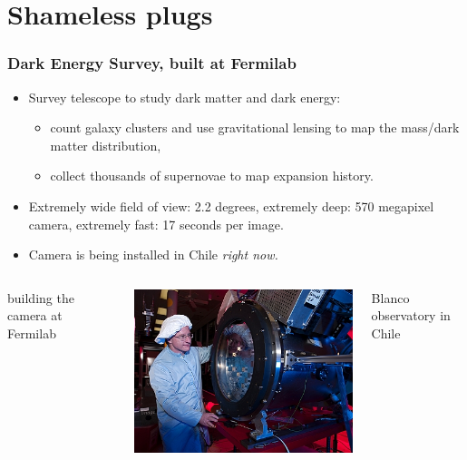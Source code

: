 \documentclass[compress]{beamer}
\begin{document}
\section*{Shameless plugs}

\begin{frame}
\frametitle{Dark Energy Survey, built at Fermilab}

\vspace{-0.25 cm}
\begin{itemize}
\item Survey telescope to study dark matter and dark energy:
\begin{itemize}
\item count galaxy clusters and use gravitational lensing to map the
  mass/dark matter distribution,
\item collect thousands of supernovae to map expansion history.
\end{itemize}

\item Extremely wide field of view: 2.2 degrees, extremely deep: 570
  megapixel camera, extremely fast: 17 seconds per image.

\item Camera is being installed in Chile {\it right now.}
\end{itemize}

\begin{columns}
\centering \scriptsize building the camera at Fermilab

\includegraphics[width=0.9\linewidth]{pictures/deccam.jpg}

\centering \scriptsize Blanco observatory in Chile


\end{columns}
\end{frame}
\end{document}
